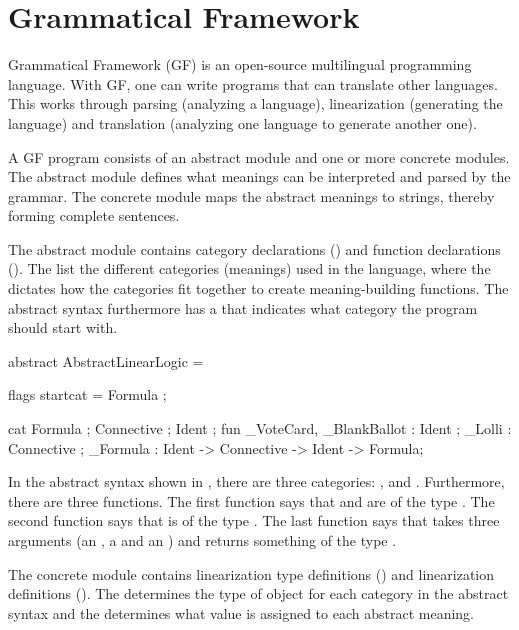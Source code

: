 \section{Grammatical Framework}
\label{03_02}


Grammatical Framework (GF) is an open-source multilingual programming language. With GF, one can write programs that can translate other languages. This works through parsing (analyzing a language), linearization (generating the language) and translation (analyzing one language to generate another one).

A GF program consists of an abstract module and one or more concrete modules. The abstract module defines what meanings can be interpreted and parsed by the grammar. The concrete module maps the abstract meanings to strings, thereby forming complete sentences.

The abstract module contains category declarations () and function declarations (). The  list the different categories (meanings) used in the language, where the  dictates how the categories fit together to create meaning-building functions. The abstract syntax furthermore has a  that indicates what category the program should start with. 

\begin{lstgf}
abstract AbstractLinearLogic = {
    flags startcat = Formula ;
    
    cat 
        Formula ; Connective ; Ident ;
    fun 
        _VoteCard, _BlankBallot : Ident ;
        _Lolli : Connective ;
        _Formula : Ident -> Connective -> Ident -> Formula;
}
\end{lstgf}

In the abstract syntax shown in , there are three categories: ,  and . Furthermore, there are three functions. The first function says that  and  are of the type . The second function says that  is of the type . The last function says that  takes three arguments (an , a  and an ) and returns something of the type .

The concrete module contains linearization type definitions () and linearization definitions
(). The  determines the type of object for each category in the abstract syntax and the  determines what value is assigned to each abstract meaning. 

